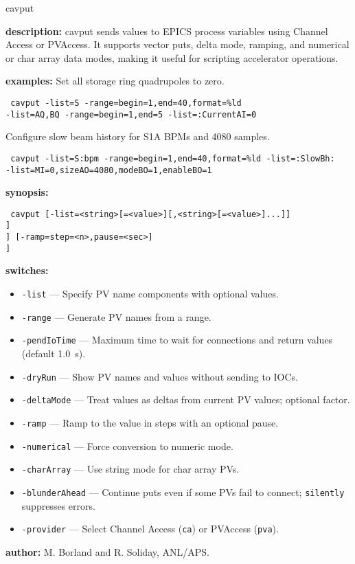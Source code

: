 \begin{sddsprog}{cavput}
\item \textbf{description:}
    cavput sends values to EPICS process variables using Channel Access or PVAccess. It supports vector puts, delta mode, ramping, and numerical or char array data modes, making it useful for scripting accelerator operations.
\item \textbf{examples:}
    Set all storage ring quadrupoles to zero.
    \begin{flushleft}{\tt
    cavput -list=S -range=begin=1,end=40,format=\%ld\\
      -list=AQ,BQ -range=begin=1,end=5 -list=:CurrentAI=0
    }\end{flushleft}
    Configure slow beam history for S1A BPMs and 4080 samples.
    \begin{flushleft}{\tt
    cavput -list=S:bpm -range=begin=1,end=40,format=\%ld -list=:SlowBh:\\
      -list=MI=0,sizeAO=4080,modeBO=1,enableBO=1
    }\end{flushleft}
\item \textbf{synopsis:}
    \begin{flushleft}{\tt
    cavput [-list=<string>[=<value>][,<string>[=<value>]...]]\\\relax
      [-range=begin=<integer>,end=<integer>[,format=<string>][,interval=<integer>]]\\\relax
      [-pendIoTime=<seconds>] [-dryRun] [-deltaMode[=factor=<value>]] [-ramp=step=<n>,pause=<sec>]\\\relax
      [-numerical] [-charArray] [-blunderAhead[=silently]]\\\relax
      [-provider=\{ca|pva\}]
    }\end{flushleft}
\item \textbf{switches:}
\begin{itemize}
  \item {\tt -list} --- Specify PV name components with optional values.
  \item {\tt -range} --- Generate PV names from a range.
  \item {\tt -pendIoTime} --- Maximum time to wait for connections and return values (default 1.0~s).
  \item {\tt -dryRun} --- Show PV names and values without sending to IOCs.
  \item {\tt -deltaMode} --- Treat values as deltas from current PV values; optional factor.
  \item {\tt -ramp} --- Ramp to the value in steps with an optional pause.
  \item {\tt -numerical} --- Force conversion to numeric mode.
  \item {\tt -charArray} --- Use string mode for char array PVs.
  \item {\tt -blunderAhead} --- Continue puts even if some PVs fail to connect; \verb|silently| suppresses errors.
  \item {\tt -provider} --- Select Channel Access ({\tt ca}) or PVAccess ({\tt pva}).
\end{itemize}
\item \textbf{author:} M. Borland and R. Soliday, ANL/APS.
\end{sddsprog}
